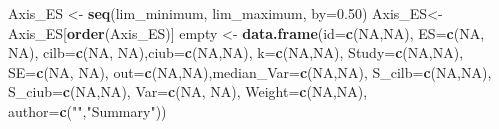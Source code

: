 \documentclass[
]{book}
\newenvironment{Shaded}{\begin{snugshade}}{\end{snugshade}}
\newcommand{\AttributeTok}[1]{\textcolor[rgb]{0.13,0.29,0.53}{#1}}
\newcommand{\ConstantTok}[1]{\textcolor[rgb]{0.56,0.35,0.01}{#1}}
\newcommand{\FloatTok}[1]{\textcolor[rgb]{0.00,0.00,0.81}{#1}}
\newcommand{\FunctionTok}[1]{\textcolor[rgb]{0.13,0.29,0.53}{\textbf{#1}}}
\newcommand{\NormalTok}[1]{#1}
\newcommand{\OtherTok}[1]{\textcolor[rgb]{0.56,0.35,0.01}{#1}}
\newcommand{\StringTok}[1]{\textcolor[rgb]{0.31,0.60,0.02}{#1}}
\begin{document}
\begin{Shaded}
\begin{Highlighting}[]
\NormalTok{  Axis\_ES }\OtherTok{\textless{}{-}} \FunctionTok{seq}\NormalTok{(lim\_minimum, lim\_maximum, }\AttributeTok{by=}\FloatTok{0.50}\NormalTok{)}
\NormalTok{  Axis\_ES}\OtherTok{\textless{}{-}}\NormalTok{Axis\_ES[}\FunctionTok{order}\NormalTok{(Axis\_ES)]}
\NormalTok{  empty }\OtherTok{\textless{}{-}} \FunctionTok{data.frame}\NormalTok{(}\AttributeTok{id=}\FunctionTok{c}\NormalTok{(}\ConstantTok{NA}\NormalTok{,}\ConstantTok{NA}\NormalTok{), }\AttributeTok{ES=}\FunctionTok{c}\NormalTok{(}\ConstantTok{NA}\NormalTok{, }\ConstantTok{NA}\NormalTok{), }\AttributeTok{cilb=}\FunctionTok{c}\NormalTok{(}\ConstantTok{NA}\NormalTok{, }\ConstantTok{NA}\NormalTok{),}\AttributeTok{ciub=}\FunctionTok{c}\NormalTok{(}\ConstantTok{NA}\NormalTok{,}\ConstantTok{NA}\NormalTok{),}
                      \AttributeTok{k=}\FunctionTok{c}\NormalTok{(}\ConstantTok{NA}\NormalTok{,}\ConstantTok{NA}\NormalTok{), }\AttributeTok{Study=}\FunctionTok{c}\NormalTok{(}\ConstantTok{NA}\NormalTok{,}\ConstantTok{NA}\NormalTok{), }\AttributeTok{SE=}\FunctionTok{c}\NormalTok{(}\ConstantTok{NA}\NormalTok{, }\ConstantTok{NA}\NormalTok{), }
                      \AttributeTok{out=}\FunctionTok{c}\NormalTok{(}\ConstantTok{NA}\NormalTok{,}\ConstantTok{NA}\NormalTok{),}\AttributeTok{median\_Var=}\FunctionTok{c}\NormalTok{(}\ConstantTok{NA}\NormalTok{,}\ConstantTok{NA}\NormalTok{), }\AttributeTok{S\_cilb=}\FunctionTok{c}\NormalTok{(}\ConstantTok{NA}\NormalTok{,}\ConstantTok{NA}\NormalTok{), }\AttributeTok{S\_ciub=}\FunctionTok{c}\NormalTok{(}\ConstantTok{NA}\NormalTok{,}\ConstantTok{NA}\NormalTok{),}
                      \AttributeTok{Var=}\FunctionTok{c}\NormalTok{(}\ConstantTok{NA}\NormalTok{, }\ConstantTok{NA}\NormalTok{), }\AttributeTok{Weight=}\FunctionTok{c}\NormalTok{(}\ConstantTok{NA}\NormalTok{,}\ConstantTok{NA}\NormalTok{), }\AttributeTok{author=}\FunctionTok{c}\NormalTok{(}\StringTok{""}\NormalTok{,}\StringTok{"Summary"}\NormalTok{))}
  

\end{Highlighting}
\end{Shaded}
\end{document}
